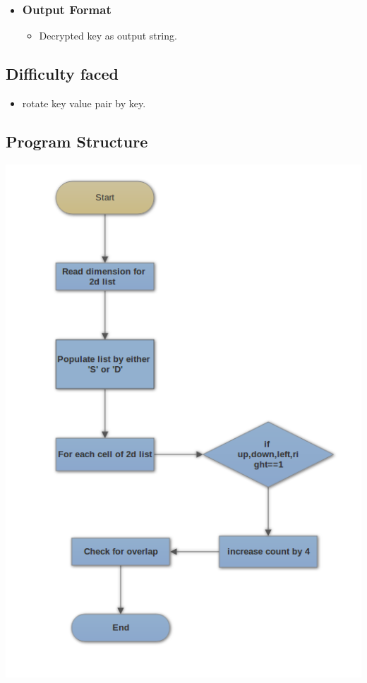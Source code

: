 \documentclass[11pt]{article}
\begin{document}
{{{\begin{itemize}
\item \subsubsection{Output Format}
\begin{itemize}
\item Decrypted key as output string.
\end{itemize}
\end{itemize}


}

\subsection{Difficulty faced}
{
\begin{itemize}
\item rotate key value pair by key.
\end{itemize}
}

\newpage
\subsection{Program Structure}
\begin{center}
\includegraphics[scale=0.60]{fc1.png}
\end{center}
\newpage

}}
\end{document}
